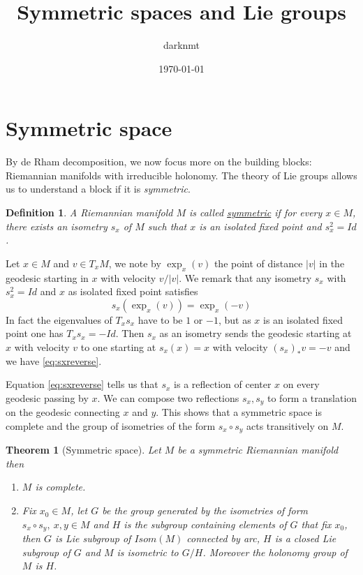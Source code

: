 \documentclass[11pt]{article}
\author{darknmt}
\date{\today}
\title{Symmetric spaces and Lie groups}
\newtheorem{theorem}{Theorem}
\newtheorem{definition}{Definition}
\begin{document}
\maketitle
\tableofcontents


\section{Symmetric space}
\label{sec:org8cdadc9}
By de Rham decomposition, we now focus more on the building blocks: Riemannian manifolds with irreducible
holonomy. The theory of Lie groups allows us to understand a block if it is \emph{symmetric}.


\begin{definition}
A Riemannian manifold \(M\) is called \uline{symmetric} if for every \(x\in M\), there exists an isometry
\(s_x\) of \(M\) such that \(x\) is an isolated fixed point and \(s_x^2=Id\).
\end{definition}


Let \(x\in M\) and \(v\in T_xM\), we note by \(\exp_x(v)\) the point of distance \(|v|\) in the geodesic
starting in \(x\) with velocity \(v/|v|\). We remark that any isometry \(s_x\) with \(s_x^2=Id\) and \(x\) as isolated fixed
point satisfies 
\begin{equation}
  \label{eq:sxreverse}
s_x(\exp_x(v)) = \exp_x(-v)
\end{equation}
In fact the eigenvalues of \(T_xs_x\) have to be \(1\) or \(-1\), but as \(x\) is an isolated fixed point
one has \(T_xs_x = -Id\). Then \(s_x\) as an isometry sends the geodesic starting at \(x\) with velocity
\(v\) to one starting at \(s_x(x)=x\) with velocity \((s_x)_* v = -v\) and we have \eqref{eq:sxreverse}.


Equation \eqref{eq:sxreverse} tells us that \(s_x\) is a reflection of center \(x\) on every geodesic
passing by \(x\). We can compose two reflections \(s_x,s_y\) to form a translation on the geodesic
connecting \(x\) and \(y\). This shows that a symmetric space is complete and the group of isometries
of the form \(s_x\circ s_y\) acts transitively on \(M\).

\begin{theorem}[Symmetric space]
\label{orgcf95720} 
Let \(M\) be a symmetric Riemannian manifold then 
\begin{enumerate}
\item \(M\) is complete.
\item Fix \(x_0\in M\), let \(G\) be the group generated by the isometries of form \(s_x\circ s_y,\ x,y\in
   M\) and \(H\) is the subgroup containing elements of \(G\) that fix \(x_0\), then \(G\) is Lie subgroup of
\(Isom(M)\) connected by arc, \(H\) is a closed Lie subgroup of \(G\) and \(M\) is isometric to
\(G/H\). Moreover the holonomy group of \(M\) is \(H\).
\end{enumerate}
\end{theorem}
\end{document}
